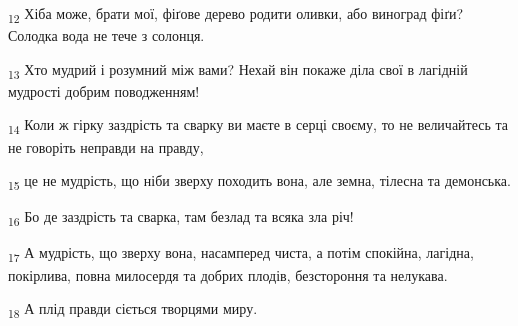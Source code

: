 \begin{tcolorbox}
\textsubscript{12} Хіба може, брати мої, фіґове дерево родити оливки, або виноград фіґи? Солодка вода не тече з солонця.
\end{tcolorbox}
\begin{tcolorbox}
\textsubscript{13} Хто мудрий і розумний між вами? Нехай він покаже діла свої в лагідній мудрості добрим поводженням!
\end{tcolorbox}
\begin{tcolorbox}
\textsubscript{14} Коли ж гірку заздрість та сварку ви маєте в серці своєму, то не величайтесь та не говоріть неправди на правду,
\end{tcolorbox}
\begin{tcolorbox}
\textsubscript{15} це не мудрість, що ніби зверху походить вона, але земна, тілесна та демонська.
\end{tcolorbox}
\begin{tcolorbox}
\textsubscript{16} Бо де заздрість та сварка, там безлад та всяка зла річ!
\end{tcolorbox}
\begin{tcolorbox}
\textsubscript{17} А мудрість, що зверху вона, насамперед чиста, а потім спокійна, лагідна, покірлива, повна милосердя та добрих плодів, безстороння та нелукава.
\end{tcolorbox}
\begin{tcolorbox}
\textsubscript{18} А плід правди сіється творцями миру.
\end{tcolorbox}
